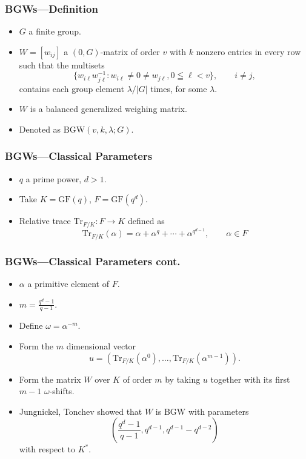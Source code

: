 \documentclass{beamer}
\newcommand{\bgw}{\mathrm{BGW}}
\newcommand{\gf}{\mathrm{GF}}
\newcommand{\tr}{\mathrm{Tr}}
\begin{document}
 \begin{frame}
  \frametitle{BGWs---Definition}
  \begin{itemize}
   \item $G$ a finite group.
   \item $W=[w_{ij}]$ a $(0,G)$-matrix of order $v$ with $k$ nonzero entries in every row such that the multisets
   $$
   \{w_{i\ell}w_{j\ell}^{-1} : w_{i\ell} \neq 0 \neq w_{j\ell}, 0 \leqq \ell < v\}, \qquad i \neq j,
   $$
   contains each group element $\lambda/|G|$ times, for some $\lambda$.
   \item $W$ is a balanced generalized weighing matrix.
   \item Denoted as $\bgw(v,k,\lambda; G)$.
  \end{itemize}
 \end{frame}
 
 \begin{frame}
  \frametitle{BGWs---Classical Parameters}
  \begin{itemize}
   \item $q$ a prime power, $d > 1$.
   \item Take $K = \gf(q)$, $F = \gf(q^d)$.
   \item Relative trace $\tr_{F/K} : F \rightarrow K$ defined as
   $$
   \tr_{F/K}(\alpha) = \alpha + \alpha^q + \cdots + \alpha^{q^{d-1}}, \qquad \alpha \in F
   $$
  \end{itemize}
 \end{frame}
 
 \begin{frame}
  \frametitle{BGWs---Classical Parameters cont.}
  \begin{itemize}
   \item $\alpha$ a primitive element of $F$.
   \item $m = \frac{q^d-1}{q-1}$.
   \item Define $\omega = \alpha^{-m}$.
   \item Form the $m$ dimensional vector
   $$
   u=(\tr_{F/K}(\alpha^0), \dots, \tr_{F/K}(\alpha^{m-1})).
   $$
   \item Form the matrix $W$ over $K$ of order $m$ by taking $u$ together with its first $m-1$ $\omega$-shifts.
   \item Jungnickel, Tonchev \cite{jungnickel-tonchev-perfect-codes-2} showed that $W$ is BGW with parameters
   $$
   \left(
   \frac{q^d-1}{q-1}, q^{d-1}, q^{d-1}-q^{d-2}
   \right)
   $$
   with respect to $K^*$.
  \end{itemize}
 \end{frame}
\end{document}
